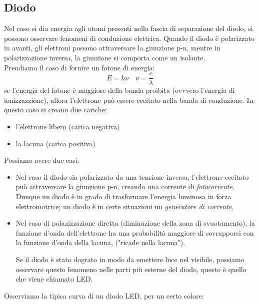 \documentclass{article}
\begin{document}
\subsection{Diodo}
Nel caso si dia energia agli atomi presenti nella fascia di separazione del diodo, si possono osservare fenomeni di conduzione elettrica. 
Quando il diodo è polarizzato in avanti, gli elettroni possono attraversare la giunzione p-n, mentre in polarizzazione inversa, la giunzione si comporta come un isolante.\\
Prendiamo il caso di fornire un fotone di energia:
\[
E = h \nu \quad \nu = \frac{c}{\lambda} 
\]
\pagebreak
se l'energia del fotone è maggiore della banda proibita (ovvvero l'energia di ionizzazzione), allora l'elettrone può essere eccitato nella banda di conduzione. 
In questo caso si creano due cariche:
\begin{itemize}
    \item l'elettrone libero (carica negativa)
    \item la lacuna (carica positiva)
\end{itemize}
Possiamo avere due casi:
\begin{itemize}
\item Nel caso il diodo sia polarizzato da una tensione inversa, l'elettrone eccitato può attraversare la giunzione p-n, creando una corrente di \textit{fotocorrente}.
Dunque un diodo è in grado di trasformare l'energia luminosa in forza elettromotrice; un diodo è in certe situazioni un \textit{generatore di corrente}. 
\item Nel caso di polazizzazione diretta (diminuzione della zona di svuotamento), la funzione d'onda dell'elettrone ha una probabilità maggiore di sovrapporsi con la funzione d'onda della lacuna, ("ricade nella lacuna").

Se il diodo è stato dograto in modo da emettere luce nel visibile, possiamo osservare questo fenomeno nelle parti più esterne del diodo, questo è quello che viene chiamato LED.

\end{itemize}
Osserviamo la tipica curva di un diodo LED, per un certo colore:
\begin{center}
\end{center}
\end{document}
